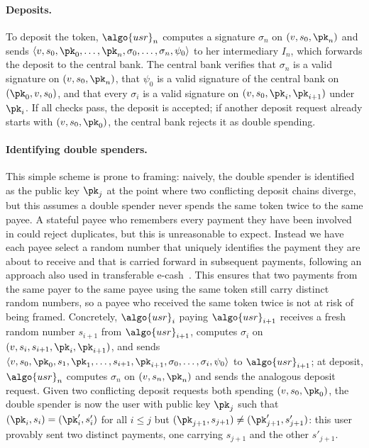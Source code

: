 \paragraph{Deposits.} To deposit the token, $\algo{usr}_n$ computes a signature
$\sigma_n$ on $(v, s_0, \pk_n)$ and sends $\langle v, s_0, \pk_0, \ldots,
\pk_n, \sigma_0, \ldots, \sigma_n, \psi_0 \rangle$ to her intermediary $I_n$,
which forwards the deposit to the central bank. The central bank verifies that
$\sigma_n$ is a valid signature on $(v, s_0, \pk_n)$, that $\psi_0$ is a valid
signature of the central bank on $(\pk_0, v, s_0)$, and that every $\sigma_i$
is a valid signature on $(v, s_0, \pk_i, \pk_{i+1})$ under $\pk_i$. If all
checks pass, the deposit is accepted; if another deposit request already starts
with $(v, s_0, \pk_0)$, the central bank rejects it as double spending.

\paragraph{Identifying double spenders.} This simple scheme is prone to
framing: naively, the double spender is identified as the public key $\pk_j$ at
the point where two conflicting deposit chains diverge, but this assumes a
double spender never spends the same token twice to the same payee. A stateful
payee who remembers every payment they have been involved in could reject
duplicates, but this is unreasonable to expect. Instead we have each payee
select a random number that uniquely identifies the payment they are about to
receive and that is carried forward in subsequent payments, following an
approach also used in transferable
e-cash~\cite{EC:CamHohLys05,CANS:FucPoiVer09,PKC:BCFK15}. This ensures that two
payments from the same payer to the same payee using the same token still carry
distinct random numbers, so a payee who received the same token twice is not at
risk of being framed. Concretely, $\algo{usr}_i$ paying $\algo{usr}_{i+1}$
receives a fresh random number $s_{i+1}$ from $\algo{usr}_{i+1}$, computes
$\sigma_i$ on $(v, s_i, s_{i+1}, \pk_i, \pk_{i+1})$, and sends $\langle v, s_0,
\pk_0, s_1, \pk_1, \ldots, s_{i+1}, \pk_{i+1}, \sigma_0, \ldots, \sigma_i,
\psi_0 \rangle$ to $\algo{usr}_{i+1}$; at deposit, $\algo{usr}_n$ computes
$\sigma_n$ on $(v, s_n, \pk_n)$ and sends the analogous deposit request.  Given
two conflicting deposit requests both spending $(v, s_0, \pk_0)$, the double
spender is now the user with public key $\pk_j$ such that $(\pk_i, s_i) =
(\pk'_i, s'_i)$ for all $i \leq j$ but $(\pk_{j+1}, s_{j+1}) \neq (\pk'_{j+1},
s'_{j+1})$: this user provably sent two distinct payments, one carrying
$s_{j+1}$ and the other $s'_{j+1}$.

